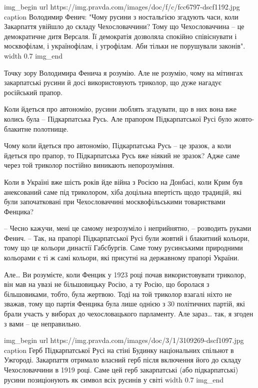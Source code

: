\ifcmt
img_begin 
        url https://img.pravda.com/images/doc/f/c/fcc6797-dscf1192.jpg
        caption Володимир Фенич: "Чому русини з ностальгією згадують часи, коли Закарпаття увійшло до складу Чехословаччини? Тому що Чехословаччина – це демократичне дитя Версаля. Її демократія дозволяла спокійно співіснувати і москвофілам, і українофілам, і угрофілам. Аби тільки не порушували законів".
        width 0.7
img_end
\fi

Точку зору Володимира Фенича я розумію. Але не розумію, чому на мітингах
закарпатські русини й досі використовують триколор, що дуже нагадує російський
прапор.

Коли йдеться про автономію, русини люблять згадувати, що в них вона вже колись
була – Підкарпатська Русь. Але прапором Підкарпатської Русі було жовто-блакитне
полотнище.

Чому коли йдеться про автономію, Підкарпатська Русь – це зразок, а коли йдеться
про прапор, то Підкарпатська Русь вже ніякий не зразок? Адже саме через той
триколор постійно виникають непорозуміння.  

Коли в Україні вже шість років йде війна з Росією на Донбасі, коли Крим був
анексований саме під триколором, хіба доцільна впертість щодо традицій, які
були започатковані при Чехословаччині москвофільськими товариствами Фенцика?

– Чесно кажучи, мені це самому незрозуміло і неприйнятно, – розводить руками
Фенич. – Так, на прапорі Підкарпатської Русі були жовтий і блакитний кольори,
тому що це кольори династії Габсбургів. Саме тому русинськими природними
кольорами є ті ж самі кольори, які присутні на державному прапорі України.

Але… Ви розумієте, коли Фенцик у 1923 році почав використовувати триколор, він
мав на увазі не більшовицьку Росію, а ту Росію, що боролася з більшовиками,
тобто, була жертвою. Тоді на той триколор взагалі ніхто не зважав, тому що
партія Фенцика була лише однією з 30 політичних партій, які брали участь у
виборах до чехословацького парламенту. Але зараз… так, я згоден з вами – це
неправильно.

\ifcmt
img_begin 
        url https://img.pravda.com/images/doc/3/1/3109269-dscf1097.jpg
        caption Герб Підкарпатської Русі на стіні Будинку національних спільнот в Ужгороді. Закарпаття отримало власний герб після включення його до складу Чехословаччини в 1919 році. Саме цей герб закарпатські (або підкарпатські) русини позиціонують як символ всіх русинів у світі
        width 0.7
img_end
\fi


